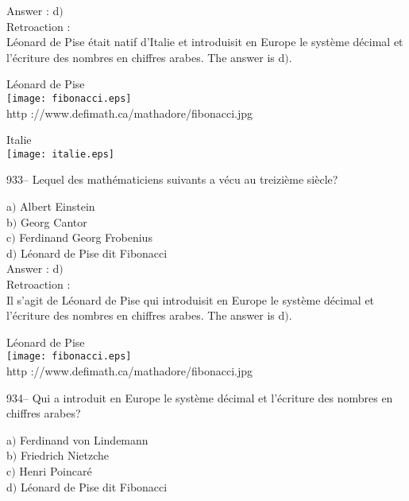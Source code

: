 ﻿\documentclass[letterpaper, 12pt]{article}
\begin{document}
Answer : d$)$\\

Retroaction : \\
L\'eonard de Pise \'etait natif d'Italie et introduisit en Europe le
syst\`eme d\'ecimal et l'\'ecriture
des nombres en chiffres arabes. The answer is d$)$.\\

        \begin{center}
        L\'eonard de Pise\\
    \texttt{[image: fibonacci.eps]}\\
        {\footnotesize http ://www.defimath.ca/mathadore/fibonacci.jpg}
    \end{center}

        \begin{center}
        Italie\\
    \texttt{[image: italie.eps]}\\
    \end{center}

933-- Lequel des math\'ematiciens suivants a v\'ecu au treizi\`eme
si\`ecle?

a$)$ Albert Einstein \\
b$)$ Georg Cantor \\
c$)$ Ferdinand Georg Frobenius \\
d$)$ L\'eonard de Pise dit Fibonacci\\

Answer : d$)$\\

Retroaction :\\
Il s'agit de L\'eonard de Pise qui introduisit en Europe le
syst\`eme d\'ecimal et l'\'ecriture
des nombres en chiffres arabes. The answer is d$)$.\\

        \begin{center}
        L\'eonard de Pise\\
    \texttt{[image: fibonacci.eps]}\\
        {\footnotesize http ://www.defimath.ca/mathadore/fibonacci.jpg}
    \end{center}

934-- Qui a introduit en Europe le syst\`eme d\'ecimal et
l'\'ecriture des nombres en chiffres arabes?

a$)$ Ferdinand von Lindemann \\
b$)$ Friedrich Nietzche \\
c$)$ Henri Poincar\'e \\
d$)$ L\'eonard de Pise dit Fibonacci\\
\end{document}
